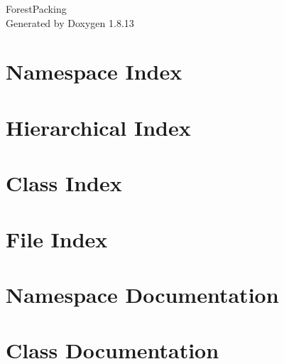 \documentclass[twoside]{book}
\newcommand{\+}{\discretionary{\mbox{\scriptsize$\hookleftarrow$}}{}{}}
\newcommand{\clearemptydoublepage}{%
  \newpage{\pagestyle{empty}\cleardoublepage}%
}
\begin{document}
\hypersetup{pageanchor=false,
             bookmarksnumbered=true,
             pdfencoding=unicode
            }
\begin{titlepage}
\vspace*{7cm}
\begin{center}%
{\Large Forest\+Packing }\\
\vspace*{1cm}
{\large Generated by Doxygen 1.8.13}\\
\end{center}
\end{titlepage}
\clearemptydoublepage
{}
\tableofcontents
\clearemptydoublepage
{}
\hypersetup{pageanchor=true}

\chapter{Namespace Index}

\chapter{Hierarchical Index}

\chapter{Class Index}

\chapter{File Index}

\chapter{Namespace Documentation}

\chapter{Class Documentation}




































\end{document}
